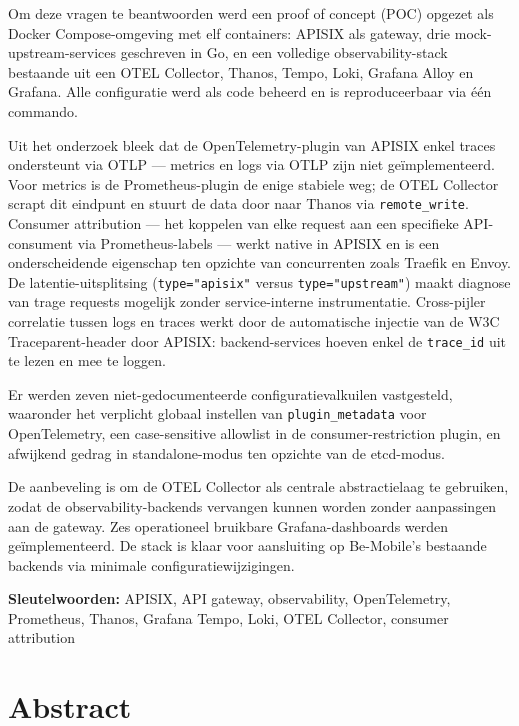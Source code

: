 Om deze vragen te beantwoorden werd een proof of concept (POC) opgezet als Docker Compose-omgeving met elf containers: APISIX als gateway, drie mock-upstream-services geschreven in Go, en een volledige observability-stack bestaande uit een OTEL Collector, Thanos, Tempo, Loki, Grafana Alloy en Grafana. Alle configuratie werd als code beheerd en is reproduceerbaar via één commando.

Uit het onderzoek bleek dat de OpenTelemetry-plugin van APISIX enkel traces ondersteunt via OTLP --- metrics en logs via OTLP zijn niet geïmplementeerd. Voor metrics is de Prometheus-plugin de enige stabiele weg; de OTEL Collector scrapt dit eindpunt en stuurt de data door naar Thanos via \texttt{remote\_write}. Consumer attribution --- het koppelen van elke request aan een specifieke API-consument via Prometheus-labels --- werkt native in APISIX en is een onderscheidende eigenschap ten opzichte van concurrenten zoals Traefik en Envoy. De latentie-uitsplitsing (\texttt{type="apisix"} versus \texttt{type="upstream"}) maakt diagnose van trage requests mogelijk zonder service-interne instrumentatie. Cross-pijler correlatie tussen logs en traces werkt door de automatische injectie van de W3C Traceparent-header door APISIX: backend-services hoeven enkel de \texttt{trace\_id} uit te lezen en mee te loggen.

Er werden zeven niet-gedocumenteerde configuratievalkuilen vastgesteld, waaronder het verplicht globaal instellen van \texttt{plugin\_metadata} voor OpenTelemetry, een case-sensitive allowlist in de consumer-restriction plugin, en afwijkend gedrag in standalone-modus ten opzichte van de etcd-modus.

De aanbeveling is om de OTEL Collector als centrale abstractielaag te gebruiken, zodat de observability-backends vervangen kunnen worden zonder aanpassingen aan de gateway. Zes operationeel bruikbare Grafana-dashboards werden geïmplementeerd. De stack is klaar voor aansluiting op Be-Mobile's bestaande backends via minimale configuratiewijzigingen.

\bigskip
\noindent\textbf{Sleutelwoorden:} APISIX, API gateway, observability, OpenTelemetry, Prometheus, Thanos, Grafana Tempo, Loki, OTEL Collector, consumer attribution


\chapter*{Abstract}

